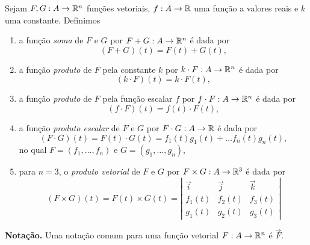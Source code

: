 \begin{definition}
    Sejam \(F,G : A \to \mathbb{R}^n\) funções vetoriais, \(f:A\to\mathbb{R}\) uma função a valores reais e \(k\) uma constante. Definimos
        \begin{enumerate}
            \item a função \textit{soma}\label{Funções vetorias!Soma} de \(F\) e \(G\) por \(F + G : A \to \mathbb{R}^n\) é dada por \[(F+G)(t) = F(t) + G(t),\]
            \item a função \textit{produto}\label{Funções vetorias!Produto por escalar} de \(F\) pela constante \(k\) por \(k\cdot F: A \to \mathbb{R}^n\) é dada por \[(k\cdot F)(t) = k\cdot F(t),\]
            \item a função \textit{produto}\label{Funções vetorias!Produto por função escalar} de \(F\) pela função escalar \(f\) por \(f\cdot F: A \to \mathbb{R}^n\) é dada por \[(f\cdot F)(t) = f(t)\cdot F(t),\]
            \item a função \textit{produto escalar}\label{Funções vetorias!Produto escalar} de \(F\) e \(G\) por \(F\cdot G: A \to\mathbb{R}\) é dada por \[(F\cdot G)(t) = F(t)\cdot G(t) = f_1(t) g_1(t) + \dots f_n(t) g_n(t),\] no qual \(F = (f_1,\dots,f_n)\) e \(G = (g_1,\dots,g_n)\),
            \item para \(n=3\), o \textit{produto vetorial}\label{Funções vetorias!Produto vetorial} de \(F\) e \(G\) por \(F\times G: A \to \mathbb{R}^3\) é dada por \[(F\times G)(t) = F(t) \times G(t) = \left|\begin{matrix}
                \overrightarrow{i} & \overrightarrow{j} & \overrightarrow{k} \\
                f_1(t) & f_2(t) & f_3(t) \\
                g_1(t) & g_2(t) & g_3(t)
            \end{matrix}\right|\]
        \end{enumerate}
\end{definition}

\textbf{Notação. } Uma notação comum para uma função vetorial \(F: A \to \mathbb{R}^n\) é \(\overrightarrow{F}\).

